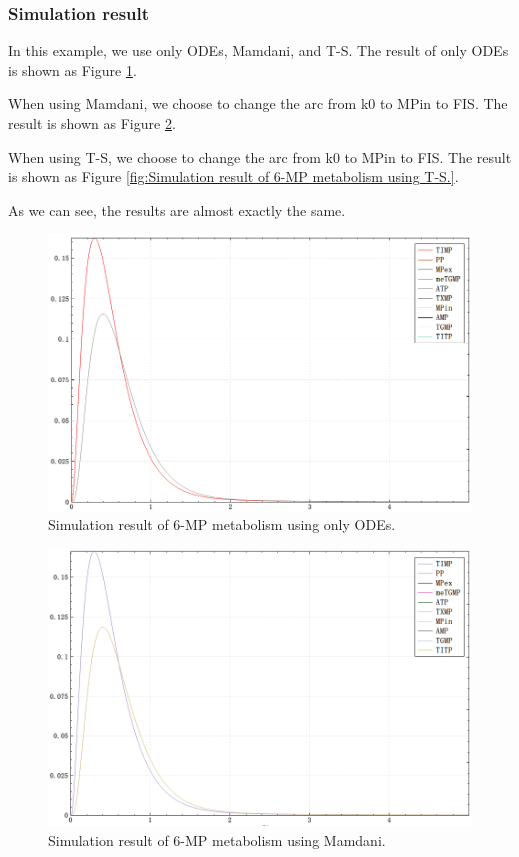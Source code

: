 \documentclass[journal,a4paper,onecolumn]{article}
\begin{document}
\subsubsection{Simulation result}
In this example, we use only ODEs, Mamdani, and T-S. The result of only ODEs is shown as Figure \ref{fig:Simulation result of 6-MP metabolism using only ODEs.}.

When using Mamdani, we choose to change the arc from k0 to MPin to FIS. The result is shown as Figure \ref{fig:Simulation result of 6-MP metabolism using Mamdani.}.

When using T-S, we choose to change the arc from k0 to MPin to FIS. The result is shown as Figure \ref{fig:Simulation result of 6-MP metabolism using T-S.}.

As we can see, the results are almost exactly the same.
\begin{figure}[!hbt]
	\begin{center}
		\includegraphics[width=\columnwidth]{fig54}
		\caption{Simulation result of 6-MP metabolism using only ODEs.}
		\label{fig:Simulation result of 6-MP metabolism using only ODEs.}
	\end{center}
\end{figure}
\begin{figure}[!hbt]
	\begin{center}
		\includegraphics[width=\columnwidth]{fig55}
		\caption{Simulation result of 6-MP metabolism using Mamdani.}
		\label{fig:Simulation result of 6-MP metabolism using Mamdani.}
	\end{center}
\end{figure}
\end{document}
